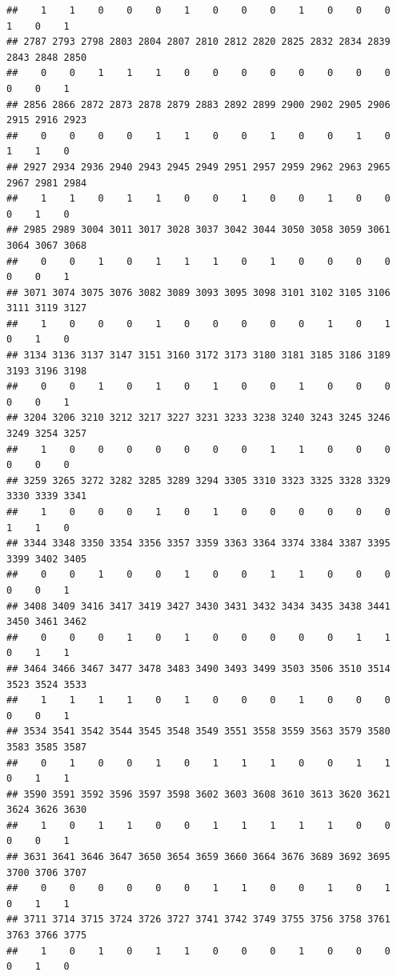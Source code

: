 \documentclass[
]{article}
\begin{document}
\begin{verbatim}
##    1    1    0    0    0    1    0    0    0    1    0    0    0    1    0    1 
## 2787 2793 2798 2803 2804 2807 2810 2812 2820 2825 2832 2834 2839 2843 2848 2850 
##    0    0    1    1    1    0    0    0    0    0    0    0    0    0    0    1 
## 2856 2866 2872 2873 2878 2879 2883 2892 2899 2900 2902 2905 2906 2915 2916 2923 
##    0    0    0    0    1    1    0    0    1    0    0    1    0    1    1    0 
## 2927 2934 2936 2940 2943 2945 2949 2951 2957 2959 2962 2963 2965 2967 2981 2984 
##    1    1    0    1    1    0    0    1    0    0    1    0    0    0    1    0 
## 2985 2989 3004 3011 3017 3028 3037 3042 3044 3050 3058 3059 3061 3064 3067 3068 
##    0    0    1    0    1    1    1    0    1    0    0    0    0    0    0    1 
## 3071 3074 3075 3076 3082 3089 3093 3095 3098 3101 3102 3105 3106 3111 3119 3127 
##    1    0    0    0    1    0    0    0    0    0    1    0    1    0    1    0 
## 3134 3136 3137 3147 3151 3160 3172 3173 3180 3181 3185 3186 3189 3193 3196 3198 
##    0    0    1    0    1    0    1    0    0    1    0    0    0    0    0    1 
## 3204 3206 3210 3212 3217 3227 3231 3233 3238 3240 3243 3245 3246 3249 3254 3257 
##    1    0    0    0    0    0    0    0    1    1    0    0    0    0    0    0 
## 3259 3265 3272 3282 3285 3289 3294 3305 3310 3323 3325 3328 3329 3330 3339 3341 
##    1    0    0    0    1    0    1    0    0    0    0    0    0    1    1    0 
## 3344 3348 3350 3354 3356 3357 3359 3363 3364 3374 3384 3387 3395 3399 3402 3405 
##    0    0    1    0    0    1    0    0    1    1    0    0    0    0    0    1 
## 3408 3409 3416 3417 3419 3427 3430 3431 3432 3434 3435 3438 3441 3450 3461 3462 
##    0    0    0    1    0    1    0    0    0    0    0    1    1    0    1    1 
## 3464 3466 3467 3477 3478 3483 3490 3493 3499 3503 3506 3510 3514 3523 3524 3533 
##    1    1    1    1    0    1    0    0    0    1    0    0    0    0    0    1 
## 3534 3541 3542 3544 3545 3548 3549 3551 3558 3559 3563 3579 3580 3583 3585 3587 
##    0    1    0    0    1    0    1    1    1    0    0    1    1    0    1    1 
## 3590 3591 3592 3596 3597 3598 3602 3603 3608 3610 3613 3620 3621 3624 3626 3630 
##    1    0    1    1    0    0    1    1    1    1    1    0    0    0    0    1 
## 3631 3641 3646 3647 3650 3654 3659 3660 3664 3676 3689 3692 3695 3700 3706 3707 
##    0    0    0    0    0    0    1    1    0    0    1    0    1    0    1    1 
## 3711 3714 3715 3724 3726 3727 3741 3742 3749 3755 3756 3758 3761 3763 3766 3775 
##    1    0    1    0    1    1    0    0    0    1    0    0    0    0    1    0 

\end{verbatim}
\end{document}
